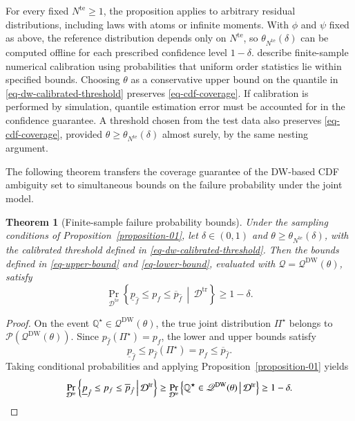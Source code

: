 \documentclass[review,11pt,3p,authoryear,nopreprintline]{elsarticle}
\newtheorem{theorem}{Theorem}
\begin{document}
For every fixed $N^{\mathrm{te}}\ge1$, the proposition applies to arbitrary residual distributions, including laws with atoms or infinite moments. With $\phi$ and $\psi$ fixed as above, the reference distribution depends only on $N^{\mathrm{te}}$, so $\theta_{N^{\mathrm{te}}}(\delta)$ can be computed offline for each prescribed confidence level $1-\delta$. \citet[Supplement, Sections~S.6--S.7]{L.J23} describe finite-sample numerical calibration using probabilities that uniform order statistics lie within specified bounds. Choosing $\theta$ as a conservative upper bound on the quantile in \eqref{eq-dw-calibrated-threshold} preserves \eqref{eq-cdf-coverage}. If calibration is performed by simulation, quantile estimation error must be accounted for in the confidence guarantee. A threshold chosen from the test data also preserves \eqref{eq-cdf-coverage}, provided $\theta\ge\theta_{N^{\mathrm{te}}}(\delta)$ almost surely, by the same nesting argument.

The following theorem transfers the coverage guarantee of the DW-based CDF ambiguity set to simultaneous bounds on the failure probability under the joint model.

\begin{theorem}[Finite-sample failure probability bounds]
  \label{theorem-01}
  Under the sampling conditions of Proposition~\ref{proposition-01}, let $\delta\in(0,1)$ and $\theta\ge\theta_{N^{\mathrm{te}}}(\delta)$, with the calibrated threshold defined in \eqref{eq-dw-calibrated-threshold}. Then the bounds defined in \eqref{eq-upper-bound} and \eqref{eq-lower-bound}, evaluated with $\mathscr Q=\mathscr Q^{\mathrm{DW}}(\theta)$, satisfy
  \begin{equation}
    \Pr_{\mathcal D^{\mathrm{te}}}\left\{\underline p_{\hat f}\le p_f\le\overline p_{\hat f}\,\middle|\,\mathcal D^{\mathrm{tr}}\right\}\ge1-\delta.
    \label{eq-failure-probability-coverage}
  \end{equation}
\end{theorem}
\begin{proof}
  On the event $\mathbb Q^\star\in\mathscr Q^{\mathrm{DW}}(\theta)$, the true joint distribution $\Pi^\star$ belongs to $\mathscr P\!\left(\mathscr Q^{\mathrm{DW}}(\theta)\right)$. Since $p_{\hat f}(\Pi^\star)=p_f$, the lower and upper bounds satisfy
  \[
    \underline p_{\hat f}\le p_{\hat f}(\Pi^\star)=p_f\le\overline p_{\hat f}.
  \]
  Taking conditional probabilities and applying Proposition~\ref{proposition-01} yields
  \[
    \Pr_{\mathcal D^{\mathrm{te}}}\left\{\underline p_{\hat f}\le p_f\le\overline p_{\hat f}\,\middle|\,\mathcal D^{\mathrm{tr}}\right\}
    \ge\Pr_{\mathcal D^{\mathrm{te}}}\left\{\mathbb Q^\star\in\mathscr Q^{\mathrm{DW}}(\theta)\,\middle|\,\mathcal D^{\mathrm{tr}}\right\}\ge1-\delta.\qedhere
  \]
\end{proof}
\end{document}
